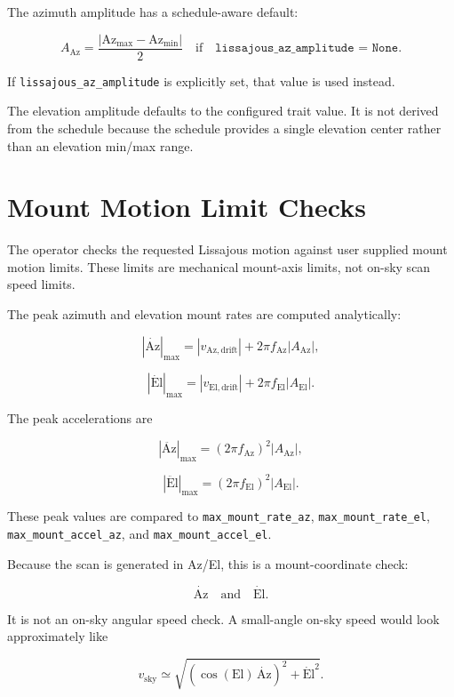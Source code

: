 \documentclass[11pt]{article}
\begin{document}
The azimuth amplitude has a schedule-aware default:

\[
    A_{\mathrm{Az}} =
    \frac{\left|\mathrm{Az}_{\max} - \mathrm{Az}_{\min}\right|}{2}
    \quad \mathrm{if}\quad
    \texttt{lissajous\_az\_amplitude = None}.
\]

If \texttt{lissajous\_az\_amplitude} is explicitly set, that value is used
instead.

The elevation amplitude defaults to the configured trait value.  It is not
derived from the schedule because the schedule provides a single elevation
center rather than an elevation min/max range.

\section*{Mount Motion Limit Checks}

The operator checks the requested Lissajous motion against user supplied mount
motion limits.  These limits are mechanical mount-axis limits, not on-sky scan
speed limits.

The peak azimuth and elevation mount rates are computed analytically:

\[
    \left|\dot{\mathrm{Az}}\right|_{\max}
    =
    \left|v_{\mathrm{Az,drift}}\right|
    + 2\pi f_{\mathrm{Az}} \left|A_{\mathrm{Az}}\right|,
\]

\[
    \left|\dot{\mathrm{El}}\right|_{\max}
    =
    \left|v_{\mathrm{El,drift}}\right|
    + 2\pi f_{\mathrm{El}} \left|A_{\mathrm{El}}\right|.
\]

The peak accelerations are

\[
    \left|\ddot{\mathrm{Az}}\right|_{\max}
    =
    \left(2\pi f_{\mathrm{Az}}\right)^2
    \left|A_{\mathrm{Az}}\right|,
\]

\[
    \left|\ddot{\mathrm{El}}\right|_{\max}
    =
    \left(2\pi f_{\mathrm{El}}\right)^2
    \left|A_{\mathrm{El}}\right|.
\]

These peak values are compared to
\texttt{max\_mount\_rate\_az}, \texttt{max\_mount\_rate\_el},
\texttt{max\_mount\_accel\_az}, and \texttt{max\_mount\_accel\_el}.

Because the scan is generated in Az/El, this is a mount-coordinate check:

\[
    \dot{\mathrm{Az}} \quad \mathrm{and} \quad \dot{\mathrm{El}}.
\]

It is not an on-sky angular speed check.  A small-angle on-sky speed would look
approximately like

\[
    v_{\mathrm{sky}}
    \simeq
    \sqrt{
        \left(\cos(\mathrm{El})\,\dot{\mathrm{Az}}\right)^2
        +
        \dot{\mathrm{El}}^2
    }.
\]
\end{document}
